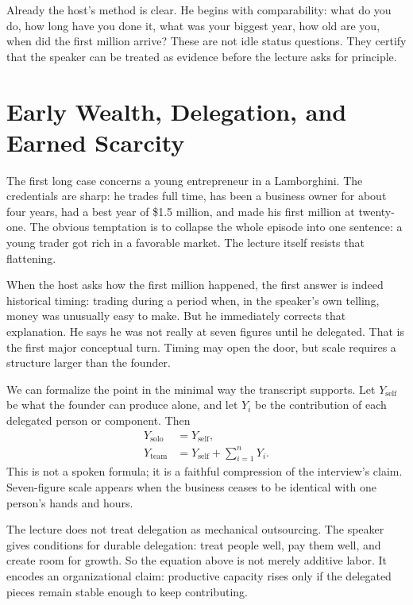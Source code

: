 Already the host's method is clear. He begins with comparability: what do you do, how long have you done it, what was your biggest year, how old are you, when did the first million arrive? These are not idle status questions. They certify that the speaker can be treated as evidence before the lecture asks for principle.

\section{Early Wealth, Delegation, and Earned Scarcity}

The first long case concerns a young entrepreneur in a Lamborghini. The credentials are sharp: he trades full time, has been a business owner for about four years, had a best year of \$1.5 million, and made his first million at twenty-one. The obvious temptation is to collapse the whole episode into one sentence: a young trader got rich in a favorable market. The lecture itself resists that flattening.

When the host asks how the first million happened, the first answer is indeed historical timing: trading during a period when, in the speaker's own telling, money was unusually easy to make. But he immediately corrects that explanation. He says he was not really at seven figures until he delegated. That is the first major conceptual turn. Timing may open the door, but scale requires a structure larger than the founder.

We can formalize the point in the minimal way the transcript supports. Let \(Y_{\mathrm{self}}\) be what the founder can produce alone, and let \(Y_i\) be the contribution of each delegated person or component. Then
\begin{align}
Y_{\mathrm{solo}} &= Y_{\mathrm{self}},\\
Y_{\mathrm{team}} &= Y_{\mathrm{self}} + \sum_{i=1}^{n} Y_i.
\end{align}
This is not a spoken formula; it is a faithful compression of the interview's claim. Seven-figure scale appears when the business ceases to be identical with one person's hands and hours.

The lecture does not treat delegation as mechanical outsourcing. The speaker gives conditions for durable delegation: treat people well, pay them well, and create room for growth. So the equation above is not merely additive labor. It encodes an organizational claim: productive capacity rises only if the delegated pieces remain stable enough to keep contributing.

